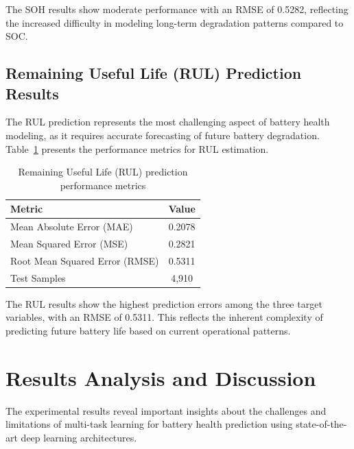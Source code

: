 The SOH results show moderate performance with an RMSE of 0.5282, reflecting the increased difficulty in modeling long-term degradation patterns compared to SOC.


\subsection{Remaining Useful Life (RUL) Prediction Results}
\label{subsec:rul_results}

The RUL prediction represents the most challenging aspect of battery health modeling, as it requires accurate forecasting of future battery degradation. Table~\ref{tab:rul_results} presents the performance metrics for RUL estimation.

\begin{table}[htbp]
\centering
\caption{Remaining Useful Life (RUL) prediction performance metrics}
\label{tab:rul_results}
\begin{tabular}{lc}
\hline
\textbf{Metric} & \textbf{Value} \\
\hline
Mean Absolute Error (MAE) & 0.2078 \\
Mean Squared Error (MSE) & 0.2821 \\
Root Mean Squared Error (RMSE) & 0.5311 \\
Test Samples & 4,910 \\
\hline
\end{tabular}
\end{table}

The RUL results show the highest prediction errors among the three target variables, with an RMSE of 0.5311. This reflects the inherent complexity of predicting future battery life based on current operational patterns.

\section{Results Analysis and Discussion}
\label{sec:results_discussion}

The experimental results reveal important insights about the challenges and limitations of multi-task learning for battery health prediction using state-of-the-art deep learning architectures.

